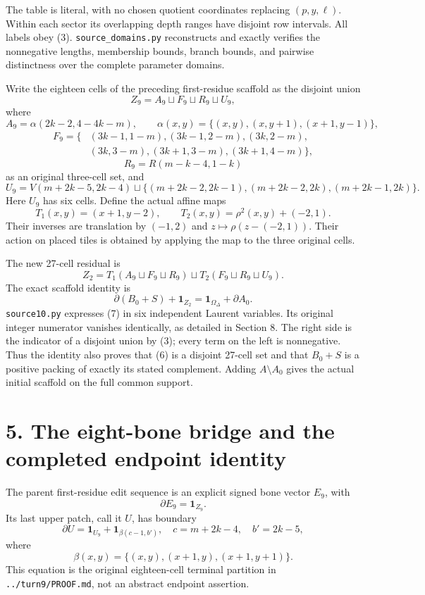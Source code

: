 \documentclass[
  11pt,
]{article}
\begin{document}
The table is literal, with no chosen quotient coordinates replacing
\((p,y,\ell)\). Within each sector its overlapping depth ranges have
disjoint row intervals. All labels obey (3). \texttt{source\_domains.py}
reconstructs and exactly verifies the nonnegative lengths, membership
bounds, branch bounds, and pairwise distinctness over the complete
parameter domains.

Write the eighteen cells of the preceding first-residue scaffold as the
disjoint union \[
 Z_9=A_9\sqcup F_9\sqcup R_9\sqcup U_9,
\] where \[
 A_9=\alpha(2k-2,4-4k-m),\qquad
 \alpha(x,y)=\{(x,y),(x,y+1),(x+1,y-1)\},
\] \[
\begin{split}
 F_9=\{&(3k-1,1-m),(3k-1,2-m),(3k,2-m),\\
       &(3k,3-m),(3k+1,3-m),(3k+1,4-m)\},
\end{split}
\] \[
 R_9=R(m-k-4,1-k)
\] as an original three-cell set, and \[
 U_9=V(m+2k-5,2k-4)
 \sqcup\{(m+2k-2,2k-1),(m+2k-2,2k),(m+2k-1,2k)\}.
\] Here \(U_9\) has six cells. Define the actual affine maps \[
 T_1(x,y)=(x+1,y-2),\qquad T_2(x,y)=\rho^2(x,y)+(-2,1).
\] Their inverses are translation by \((-1,2)\) and
\(z\mapsto\rho(z-(-2,1))\). Their action on placed tiles is obtained by
applying the map to the three original cells.

The new 27-cell residual is \[
 Z_2=T_1(A_9\sqcup F_9\sqcup R_9)
       \sqcup T_2(F_9\sqcup R_9\sqcup U_9).                \tag{6}
\] The exact scaffold identity is \[
 \partial(B_0+S)+\mathbf1_{Z_2}
    =\mathbf1_{\Omega_\Delta}+\partial A_0.                \tag{7}
\] \texttt{source10.py} expresses (7) in six independent Laurent
variables. Its original integer numerator vanishes identically, as
detailed in Section 8. The right side is the indicator of a disjoint
union by (3); every term on the left is nonnegative. Thus the identity
also proves that (6) is a disjoint 27-cell set and that \(B_0+S\) is a
positive packing of exactly its stated complement. Adding
\(A\setminus A_0\) gives the actual initial scaffold on the full common
support.

\section{5. The eight-bone bridge and the completed endpoint
identity}\label{the-eight-bone-bridge-and-the-completed-endpoint-identity}

The parent first-residue edit sequence is an explicit signed bone vector
\(E_9\), with \[
 \partial E_9=\mathbf1_{Z_9}.
\] Its last upper patch, call it \(U\), has boundary \[
 \partial U=\mathbf1_{U_9}+\mathbf1_{\beta(c-1,b')},
 \quad c=m+2k-4,\quad b'=2k-5,
\] where \[
 \beta(x,y)=\{(x,y),(x+1,y),(x+1,y+1)\}.
\] This equation is the original eighteen-cell terminal partition in
\texttt{../turn9/PROOF.md}, not an abstract endpoint assertion.
\end{document}
